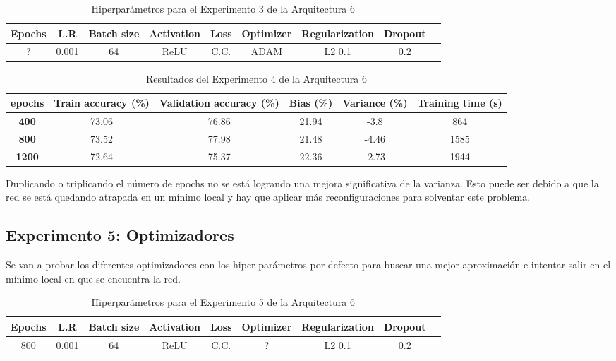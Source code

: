\documentclass{article}
\begin{document}
        \begin{table}[!h]
				\begin{tabular}{|c|c|c|c|c|c|c|c|c|}
					\textbf{Epochs}&\textbf{L.R}&\textbf{Batch size}&\textbf{Activation}&\textbf{Loss}&\textbf{Optimizer}&\textbf{Regularization}&\textbf{Dropout}   \\ \hline
					? & 0.001 & 64 & ReLU & C.C. & ADAM & L2 0.1 & 0.2 
				\end{tabular}
				\caption{Hiperpar\'ametros para el Experimento 3 de la Arquitectura 6}
				\label{tab:hip-a6-e2}
			\end{table}

    
   
   \begin{table}[!h]
				\begin{center}
					\begin{tabular}{ c | c | c | c | c | c |}
						 \textbf{epochs} & \textbf{Train accuracy (\%)} & \textbf{Validation accuracy (\%)} & \textbf{Bias (\%)} & \textbf{Variance (\%)} & \textbf{Training time (s)} \\ \hline
						\textbf{400 } & 73.06   & 76.86 &  21.94 & -3.8 &864   \\ \hline
                        \textbf{800 } & 73.52   &77.98 &  21.48 & -4.46  &1585    \\ \hline
                        \textbf{1200} &  72.64  &75.37  &  22.36& -2.73 &1944    \\ \hline
					\end{tabular}
					\caption{Resultados del Experimento 4 de la Arquitectura 6}
					\label{tab:res-a2-e5}
				\end{center}
			\end{table}

Duplicando o triplicando el n\'umero de epochs no se est\'a logrando una mejora significativa de la varianza. Esto puede ser debido a que la red se est\'a quedando atrapada en un m\'inimo local y hay que aplicar más reconfiguraciones para solventar este problema. 
\subsection{Experimento 5: Optimizadores}
Se van a probar los diferentes optimizadores con los hiper par\'ametros por defecto para buscar una mejor aproximaci\'on e intentar salir en el m\'inimo local en que se encuentra la red. 

 \begin{table}[!h]
				\begin{tabular}{|c|c|c|c|c|c|c|c|c|}
					\textbf{Epochs}&\textbf{L.R}&\textbf{Batch size}&\textbf{Activation}&\textbf{Loss}&\textbf{Optimizer}&\textbf{Regularization}&\textbf{Dropout}   \\ \hline
					800 & 0.001 & 64 & ReLU & C.C. & ? & L2 0.1 & 0.2 
				\end{tabular}
				\caption{Hiperpar\'ametros para el Experimento 5 de la Arquitectura 6}
				\label{tab:hip-a6-e2}
			\end{table}
\end{document}
